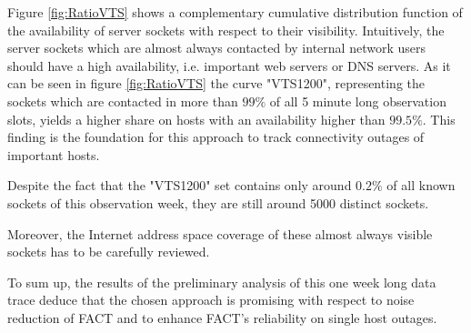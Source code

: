 \documentclass{sigcomm-alternate}
\begin{document}
Figure \ref{fig:RatioVTS} shows a complementary cumulative distribution
function of the availability of server sockets with respect to their
visibility. Intuitively, the server sockets which are almost always
contacted by internal network users should have a high availability,
i.e. important web servers or DNS servers. As it can be seen in
figure \ref{fig:RatioVTS} the curve "VTS1200", representing the
sockets which are contacted in more than $99\%$ of all 5 minute
long observation slots, yields a higher share on hosts with an
availability higher than $99.5\%$. This finding is the foundation
for this approach to track connectivity outages of important hosts.

Despite the fact that the "VTS1200" set contains only around $0.2\%$
of all known sockets of this observation week, they are still around
5000 distinct sockets.

Moreover, the Internet address space coverage of these almost always
visible sockets has to be carefully reviewed.

To sum up, the results of the preliminary analysis of this one week
long data trace deduce that the chosen approach is promising with
respect to noise reduction of FACT and to enhance FACT's reliability
on single host outages.

 
\end{document}
